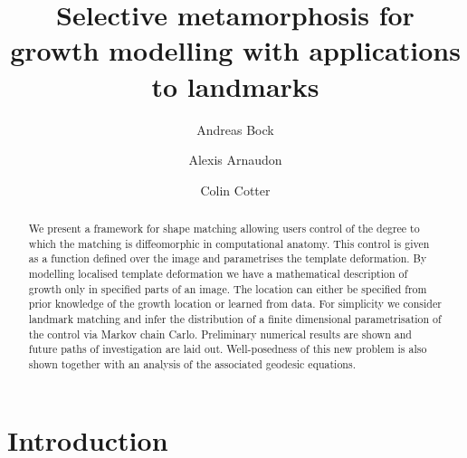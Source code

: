 \documentclass[runningheads]{llncs}
\begin{document}
%
\title{Selective metamorphosis for growth modelling with applications to landmarks}
%
%
\author{Andreas Bock \and  Alexis Arnaudon \and Colin Cotter}
%
%
%
\maketitle              %

\begin{abstract}
We present a framework for shape matching allowing users control of the degree
to which the matching is diffeomorphic in computational anatomy. This control is
given as a function defined over the image and parametrises the template
deformation. By modelling localised template deformation we have a mathematical
description of growth only in specified parts of an image. The location can
either be specified from prior knowledge of the growth location or learned from
data. For simplicity we consider landmark matching and infer the distribution of
a finite dimensional parametrisation of the control via Markov chain Carlo.
Preliminary numerical results are shown and future paths of investigation are
laid out. Well-posedness of this new problem is also shown together with an
analysis of the associated geodesic equations. 

\end{abstract}

\section{Introduction}
\end{document}
